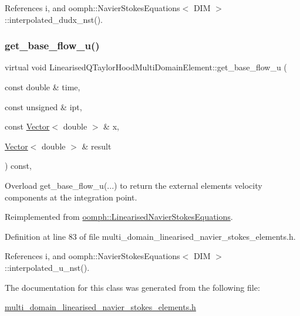 References i, and oomph\+::\+Navier\+Stokes\+Equations$<$ D\+I\+M $>$\+::interpolated\+\_\+dudx\+\_\+nst().

\mbox{\label{classLinearisedQTaylorHoodMultiDomainElement_ad441b17104c64206b308779a52cc814e}} 
\subsubsection{\texorpdfstring{get\+\_\+base\+\_\+flow\+\_\+u()}{get\_base\_flow\_u()}}
{\footnotesize\ttfamily virtual void Linearised\+Q\+Taylor\+Hood\+Multi\+Domain\+Element\+::get\+\_\+base\+\_\+flow\+\_\+u (\begin{DoxyParamCaption}\item[{const double \&}]{time,  }\item[{const unsigned \&}]{ipt,  }\item[{const \hyperlink{classoomph_1_1Vector}{Vector}$<$ double $>$ \&}]{x,  }\item[{\hyperlink{classoomph_1_1Vector}{Vector}$<$ double $>$ \&}]{result }\end{DoxyParamCaption}) const\hspace{0.3cm}{\ttfamily [inline]}, {\ttfamily [virtual]}}



Overload get\+\_\+base\+\_\+flow\+\_\+u(...) to return the external element\textquotesingle{}s velocity components at the integration point. 



Reimplemented from \hyperlink{classoomph_1_1LinearisedNavierStokesEquations_a7c219a316dbe67ef01f8c5b666e0c9ae}{oomph\+::\+Linearised\+Navier\+Stokes\+Equations}.



Definition at line 83 of file multi\+\_\+domain\+\_\+linearised\+\_\+navier\+\_\+stokes\+\_\+elements.\+h.



References i, and oomph\+::\+Navier\+Stokes\+Equations$<$ D\+I\+M $>$\+::interpolated\+\_\+u\+\_\+nst().



The documentation for this class was generated from the following file\+:\begin{DoxyCompactItemize}
\item 
\hyperlink{multi__domain__linearised__navier__stokes__elements_8h}{multi\+\_\+domain\+\_\+linearised\+\_\+navier\+\_\+stokes\+\_\+elements.\+h}\end{DoxyCompactItemize}
